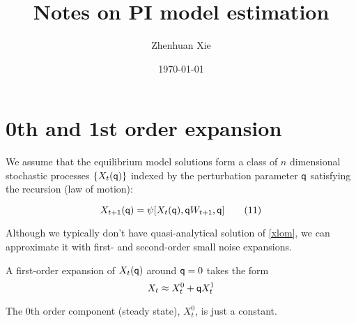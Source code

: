 \documentclass[12pt]{article}
\title{Notes on PI model estimation}
\author{Zhenhuan Xie}
\date{\today}
\theoremstyle{definition}
\theoremstyle{remark}
\begin{document}
\maketitle

\section*{0th and 1st order expansion}

We assume that the equilibrium model solutions form a class of $n$ dimensional stochastic processes $\{X_t({\sf q})\}$ indexed by the perturbation parameter $\sf q$ satisfying the recursion (law of motion):

\begin{equation*}
    X_{t+1}({\sf q}) = \psi[X_t({\sf q}), {\sf q}W_{t+1}, {\sf q}] \label{xlom} \tag{11}
\end{equation*}

Although we typically don't have quasi-analytical solution of \eqref{xlom}, we can approximate it with first- and second-order small noise expansions. 

A first-order expansion of $X_t({\sf q})$ around ${\sf q} = 0$ takes the form
\begin{equation*}
    X_t \approx X_t^0 + {\sf q} X_t^1
\end{equation*}

The 0th order component (steady state), $X_t^0$, is just a constant. 
\end{document}
